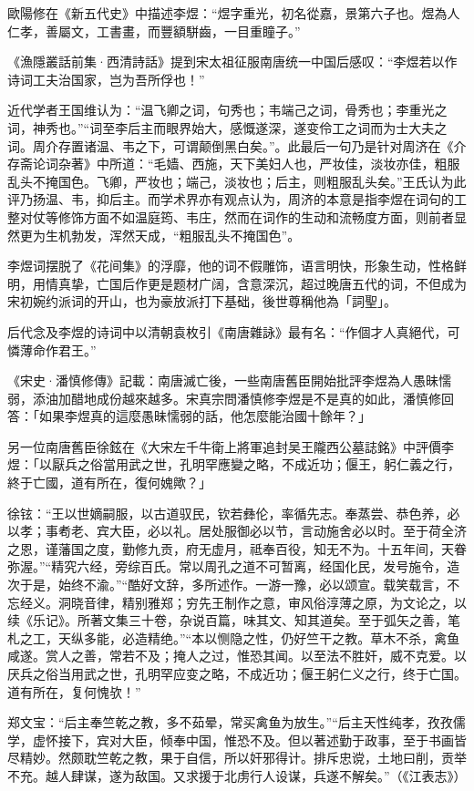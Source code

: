 歐陽修在《新五代史》中描述李煜：“煜字重光，初名從嘉，景第六子也。煜為人仁孝，善屬文，工書畫，而豐額駢齒，一目重瞳子。”

《漁隱叢話前集·西清詩話》提到宋太祖征服南唐统一中国后感叹：“李煜若以作诗词工夫治国家，岂为吾所俘也！”

近代学者王国维认为：“温飞卿之词，句秀也；韦端己之词，骨秀也；李重光之词，神秀也。”“词至李后主而眼界始大，感慨遂深，遂变伶工之词而为士大夫之词。周介存置诸温、韦之下，可谓颠倒黑白矣。”。此最后一句乃是针对周济在《介存斋论词杂著》中所道：“毛嫱、西施，天下美妇人也，严妆佳，淡妆亦佳，粗服乱头不掩国色。飞卿，严妆也；端己，淡妆也；后主，则粗服乱头矣。”王氏认为此评乃扬温、韦，抑后主。而学术界亦有观点认为，周济的本意是指李煜在词句的工整对仗等修饰方面不如温庭筠、韦庄，然而在词作的生动和流畅度方面，则前者显然更为生机勃发，浑然天成，“粗服乱头不掩国色”。

李煜词摆脱了《花间集》的浮靡，他的词不假雕饰，语言明快，形象生动，性格鲜明，用情真挚，亡国后作更是题材广阔，含意深沉，超过晚唐五代的词，不但成为宋初婉约派词的开山，也为豪放派打下基础，後世尊稱他為「詞聖」。

后代念及李煜的诗词中以清朝袁枚引《南唐雜詠》最有名：“作個才人真絕代，可憐薄命作君王。”

《宋史·潘慎修傳》記載：南唐滅亡後，一些南唐舊臣開始批評李煜為人愚昧懦弱，添油加醋地成份越來越多。宋真宗問潘慎修李煜是不是真的如此，潘慎修回答：「如果李煜真的這麼愚昧懦弱的話，他怎麼能治國十餘年？」

另一位南唐舊臣徐鉉在《大宋左千牛衛上將軍追封吴王隴西公墓誌銘》中評價李煜：「以厭兵之俗當用武之世，孔明罕應變之略，不成近功；偃王，躬仁義之行，終于亡國，道有所在，復何媿歟？」

徐铉：“王以世嫡嗣服，以古道驭民，钦若彝伦，率循先志。奉蒸尝、恭色养，必以孝；事耇老、宾大臣，必以礼。居处服御必以节，言动施舍必以时。至于荷全济之恩，谨藩国之度，勤修九贡，府无虚月，祗奉百役，知无不为。十五年间，天眷弥渥。”“精究六经，旁综百氏。常以周孔之道不可暂离，经国化民，发号施令，造次于是，始终不渝。”“酷好文辞，多所述作。一游一豫，必以颂宣。载笑载言，不忘经义。洞晓音律，精别雅郑；穷先王制作之意，审风俗淳薄之原，为文论之，以续《乐记》。所著文集三十卷，杂说百篇，味其文、知其道矣。至于弧矢之善，笔札之工，天纵多能，必造精绝。”“本以恻隐之性，仍好竺干之教。草木不杀，禽鱼咸遂。赏人之善，常若不及；掩人之过，惟恐其闻。以至法不胜奸，威不克爱。以厌兵之俗当用武之世，孔明罕应变之略，不成近功；偃王躬仁义之行，终于亡国。道有所在，复何愧欤！”

郑文宝：“后主奉竺乾之教，多不茹晕，常买禽鱼为放生。”“后主天性纯孝，孜孜儒学，虚怀接下，宾对大臣，倾奉中国，惟恐不及。但以著述勤于政事，至于书画皆尽精妙。然颇耽竺乾之教，果于自信，所以奸邪得计。排斥忠谠，土地曰削，贡举不充。越人肆谋，遂为敌国。又求援于北虏行人设谋，兵遂不解矣。”（《江表志》）

